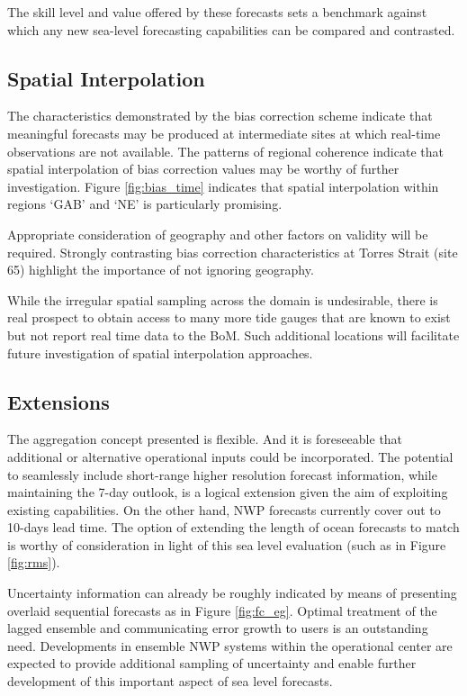 The skill level and value offered by these forecasts sets a benchmark against which any new sea-level forecasting capabilities can be compared and contrasted.  

\subsection{Spatial Interpolation}
The characteristics demonstrated by the bias correction scheme indicate that meaningful forecasts may be produced at intermediate sites at which real-time observations are not available.
The patterns of regional coherence indicate that spatial interpolation of bias correction values may be worthy of further investigation.
Figure \ref{fig:bias_time} indicates that spatial interpolation within regions `GAB' and `NE' is particularly promising.

Appropriate consideration of geography and other factors on validity will be required.
Strongly contrasting bias correction characteristics at Torres Strait (site 65) highlight the importance of not ignoring geography.

While the irregular spatial sampling across the domain is undesirable, there is real prospect to obtain access to many more tide gauges that are known to exist but not report real time data to the BoM.   
Such additional locations will facilitate future investigation of spatial interpolation approaches.    


\subsection{Extensions}
The aggregation concept presented is flexible.
And it is foreseeable that additional or alternative operational inputs could be incorporated. 
The potential to seamlessly include short-range higher resolution forecast information, while maintaining the 7-day outlook, is a logical extension given the aim of exploiting existing capabilities.
On the other hand, NWP forecasts currently cover out to 10-days lead time. The option of extending the length of ocean forecasts to match is worthy of consideration in light of this sea level evaluation (such as in Figure \ref{fig:rms}).

Uncertainty information can already be roughly indicated by means of presenting overlaid sequential forecasts as in Figure \ref{fig:fc_eg}.
Optimal treatment of the lagged ensemble and communicating error growth to users is an outstanding need.
Developments in ensemble NWP systems within the operational center are expected to provide additional sampling of uncertainty and enable further development of this important aspect of sea level forecasts.  

